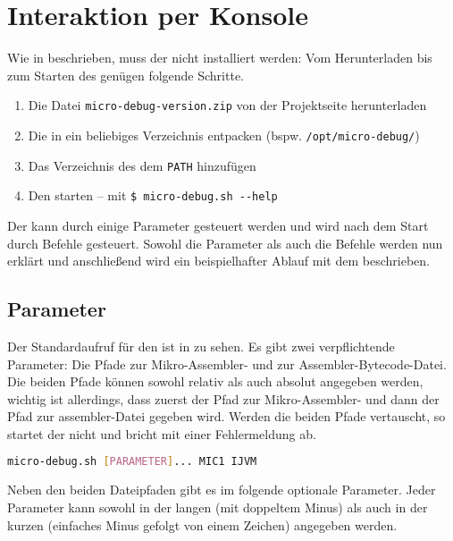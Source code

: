 \chapter{Interaktion per Konsole}
Wie in  beschrieben, muss der \md nicht installiert werden: Vom Herunterladen bis zum Starten des \md genügen folgende Schritte.

\begin{enumerate}
\item Die Datei \texttt{micro-debug-version.zip} von der Projektseite herunterladen
\item Die  in ein beliebiges Verzeichnis entpacken (bspw. \texttt{/opt/micro-debug/})
\item Das Verzeichnis des \md dem \texttt{PATH} hinzufügen
\item Den \md starten -- mit \texttt{\$ micro-debug.sh -{}-help}
\end{enumerate}

Der \md kann durch einige Parameter gesteuert werden und wird nach dem Start durch Befehle gesteuert. Sowohl die Parameter als auch die Befehle werden nun erklärt und anschließend wird ein beispielhafter Ablauf mit dem \md beschrieben.

\section{Parameter}
Der Standardaufruf für den \md ist in  zu sehen. Es gibt zwei verpflichtende Parameter: Die Pfade zur Mikro-Assembler- und zur Assembler-Bytecode-Datei. Die beiden Pfade können sowohl relativ als auch absolut angegeben werden, wichtig ist allerdings, dass zuerst der Pfad zur Mikro-Assembler- und dann der Pfad zur assembler-Datei gegeben wird. Werden die beiden Pfade vertauscht, so startet der \md nicht und bricht mit einer Fehlermeldung ab.

\begin{lstlisting}[language=sh,caption={Aufruf des \md -- Konsolenversion},label=\lstlbl{aufruf-konsolenversion}]
  micro-debug.sh [PARAMETER]... MIC1 IJVM
\end{lstlisting}

Neben den beiden Dateipfaden gibt es im folgende optionale Parameter. Jeder Parameter kann sowohl in der langen (mit doppeltem Minus) als auch in der kurzen (einfaches Minus gefolgt von einem Zeichen) angegeben werden.

